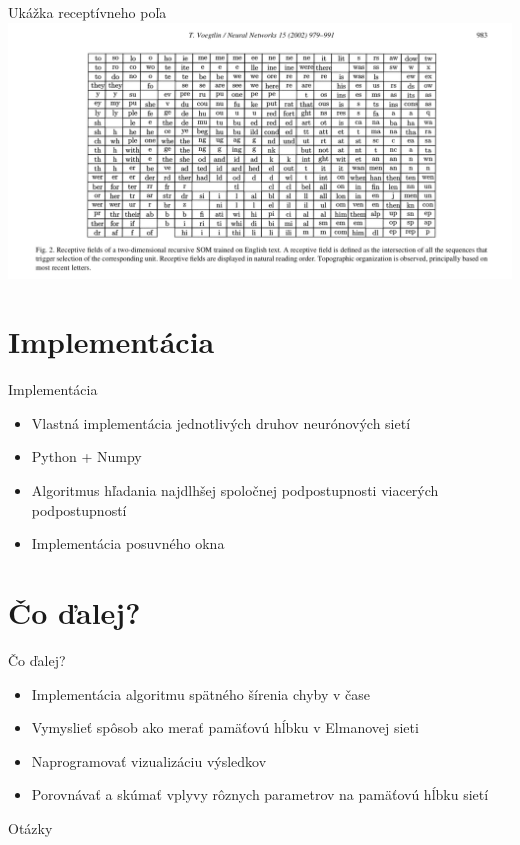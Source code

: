 \documentclass[10pt]{beamer}
\begin{document}
\begin{frame}[fragile]{Ukážka receptívneho poľa}
\includegraphics[width=\textwidth]{receptive_field}
\end{frame}

\section{Implementácia}
\begin{frame}{Implementácia}

\begin{itemize}
  \item Vlastná implementácia jednotlivých druhov neurónových sietí
  \item Python + Numpy
  \item Algoritmus hľadania najdlhšej spoločnej podpostupnosti viacerých podpostupností
  \item Implementácia posuvného okna
\end{itemize}
\end{frame}


\section{Čo ďalej?}
\begin{frame}{Čo ďalej?}
  \begin{itemize}
    \item Implementácia algoritmu spätného šírenia chyby v čase
    \item Vymyslieť spôsob ako merať pamäťovú hĺbku v Elmanovej sieti
    \item Naprogramovať vizualizáciu výsledkov
    \item Porovnávať a skúmať vplyvy rôznych parametrov na pamäťovú hĺbku sietí
  \end{itemize}
  \end{frame}


{
\begin{frame}[standout]
  Otázky
\end{frame}
}

\appendix
\end{document}
